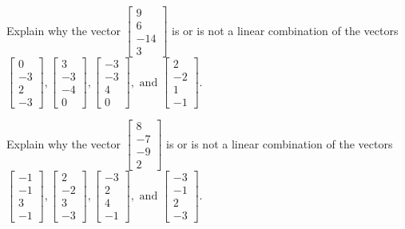 \documentclass{article}
\begin{document}
\begin{exerciseStatement}
    Explain why the vector \(\left[\begin{array}{c}
9 \\
6 \\
-14 \\
3
\end{array}\right]\)  is or is not a linear
combination of the vectors \(\left[\begin{array}{c}
0 \\
-3 \\
2 \\
-3
\end{array}\right] , \left[\begin{array}{c}
3 \\
-3 \\
-4 \\
0
\end{array}\right] , \left[\begin{array}{c}
-3 \\
-3 \\
4 \\
0
\end{array}\right] , \text{ and } \left[\begin{array}{c}
2 \\
-2 \\
1 \\
-1
\end{array}\right]\).



  
\end{exerciseStatement}

\begin{exerciseStatement}
    Explain why the vector \(\left[\begin{array}{c}
8 \\
-7 \\
-9 \\
2
\end{array}\right]\)  is or is not a linear
combination of the vectors \(\left[\begin{array}{c}
-1 \\
-1 \\
3 \\
-1
\end{array}\right] , \left[\begin{array}{c}
2 \\
-2 \\
3 \\
-3
\end{array}\right] , \left[\begin{array}{c}
-3 \\
2 \\
4 \\
-1
\end{array}\right] , \text{ and } \left[\begin{array}{c}
-3 \\
-1 \\
2 \\
-3
\end{array}\right]\).



  
\end{exerciseStatement}
\end{document}
